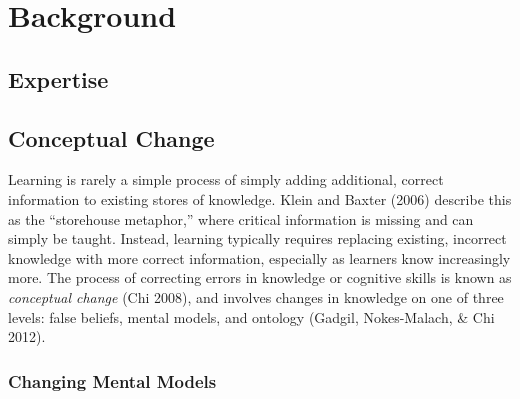 \documentclass{book}
\begin{document}
\chapter{Background}

\section{Expertise}


\section{Conceptual Change}

Learning is rarely a simple process of simply adding additional, correct information to existing stores of knowledge. Klein and Baxter (2006) describe this as the ``storehouse metaphor,'' where critical information is missing and can simply be taught. Instead, learning typically requires replacing existing, incorrect knowledge with more correct information, especially as learners know increasingly more. The process of correcting errors in knowledge or cognitive skills is known as \emph{conceptual change} (Chi 2008), and involves changes in knowledge on one of three levels: false beliefs, mental models, and ontology (Gadgil, Nokes-Malach, & Chi 2012).



\subsection{Changing Mental Models}
\end{document}
